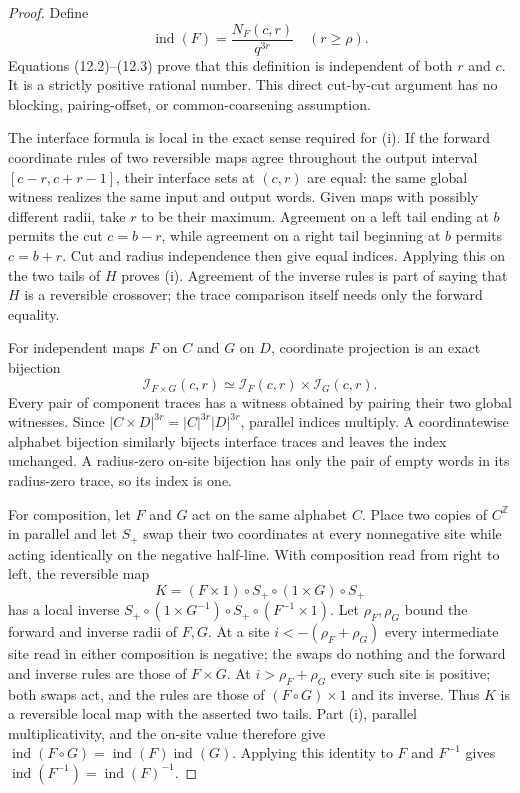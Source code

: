 \documentclass[11pt]{article}
\theoremstyle{definition}
\theoremstyle{remark}
\begin{document}
\begin{proof}
Define
\[
            \operatorname{ind}(F)=\frac{N_F(c,r)}{q^{3r}}
            \quad(r\ge\rho).                               \tag{12.4}
\]
Equations (12.2)--(12.3) prove that this definition is independent of both
$r$ and $c$.  It is a strictly positive rational number.  This direct
cut-by-cut argument has no blocking, pairing-offset, or common-coarsening
assumption.

The interface formula is local in the exact sense required for (i).  If the
forward coordinate rules of two reversible maps agree throughout the output
interval $[c-r,c+r-1]$, their interface sets at $(c,r)$ are equal: the same
global witness realizes the same input and output words.  Given maps with
possibly different radii, take $r$ to be their maximum.  Agreement on a left
tail ending at $b$ permits the cut $c=b-r$, while agreement on a right tail
beginning at $b$ permits $c=b+r$.  Cut and radius independence then give
equal indices.  Applying this on the two tails of $H$ proves (i).  Agreement
of the inverse rules is part of saying that $H$ is a reversible crossover;
the trace comparison itself needs only the forward equality.

For independent maps $F$ on $C$ and $G$ on $D$, coordinate projection is an
exact bijection
\[
 \mathcal I_{F\times G}(c,r)\simeq
 \mathcal I_F(c,r)\times\mathcal I_G(c,r).
\]
Every pair of component traces has a witness obtained by pairing their two
global witnesses.  Since $|C\times D|^{3r}=|C|^{3r}|D|^{3r}$, parallel
indices multiply.  A coordinatewise alphabet bijection similarly bijects
interface traces and leaves the index unchanged.  A radius-zero on-site
bijection has only the pair of empty words in its radius-zero trace, so its
index is one.

For composition, let $F$ and $G$ act on the same alphabet $C$.
Place two copies of $C^{\mathbb Z}$ in parallel and let $S_+$ swap their two
coordinates at every nonnegative site while acting identically on the
negative half-line.  With composition read from right to left, the reversible
map
\[
 K=(F\times1)\circ S_+\circ(1\times G)\circ S_+             \tag{12.5}
\]
has a local inverse
$S_+\circ(1\times G^{-1})\circ S_+\circ(F^{-1}\times1)$.
Let $\rho_F,\rho_G$ bound the forward and inverse radii of $F,G$.
At a site $i<-(\rho_F+\rho_G)$ every intermediate site read in
either composition is negative; the swaps do nothing and the forward
and inverse rules are those of $F\times G$.
At $i>\rho_F+\rho_G$ every such site is positive; both swaps act,
and the rules are those of $(F\circ G)\times1$ and its inverse.
Thus $K$ is a reversible local map with the asserted two tails.  Part (i), parallel multiplicativity, and the
on-site value therefore give
$\operatorname{ind}(F\circ G)=\operatorname{ind}(F)
\operatorname{ind}(G)$.  Applying this identity to $F$ and $F^{-1}$ gives
$\operatorname{ind}(F^{-1})=\operatorname{ind}(F)^{-1}$.


\end{proof}
\end{document}
